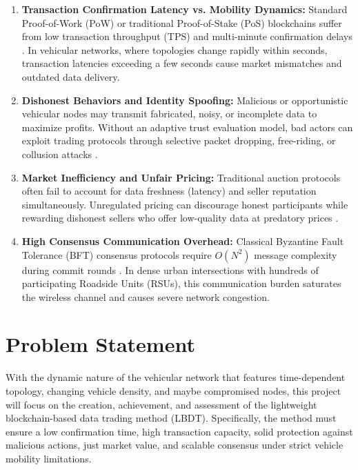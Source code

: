 \begin{enumerate}
    \item \textbf{Transaction Confirmation Latency vs. Mobility Dynamics:} Standard Proof-of-Work (PoW) or traditional Proof-of-Stake (PoS) blockchains suffer from low transaction throughput (TPS) and multi-minute confirmation delays \cite{nakamoto2008bitcoin}. In vehicular networks, where topologies change rapidly within seconds, transaction latencies exceeding a few seconds cause market mismatches and outdated data delivery.
    \item \textbf{Dishonest Behaviors and Identity Spoofing:} Malicious or opportunistic vehicular nodes may transmit fabricated, noisy, or incomplete data to maximize profits. Without an adaptive trust evaluation model, bad actors can exploit trading protocols through selective packet dropping, free-riding, or collusion attacks \cite{rosenstatter2018modelling}.
    \item \textbf{Market Inefficiency and Unfair Pricing:} Traditional auction protocols often fail to account for data freshness (latency) and seller reputation simultaneously. Unregulated pricing can discourage honest participants while rewarding dishonest sellers who offer low-quality data at predatory prices \cite{guan2020towards}.
    \item \textbf{High Consensus Communication Overhead:} Classical Byzantine Fault Tolerance (BFT) consensus protocols require $O(N^2)$ message complexity during commit rounds \cite{lamport1982byzantine}. In dense urban intersections with hundreds of participating Roadside Units (RSUs), this communication burden saturates the wireless channel and causes severe network congestion.
\end{enumerate}

\section{Problem Statement}\label{sec:intro_problem}
\noindent With the dynamic nature of the vehicular network that features time-dependent topology, changing vehicle density, and maybe compromised nodes, this project will focus on the creation, achievement, and assessment of the lightweight blockchain-based data trading method (LBDT). Specifically, the method must ensure a low confirmation time, high transaction capacity, solid protection against malicious actions, just market value, and scalable consensus under strict vehicle mobility limitations.

